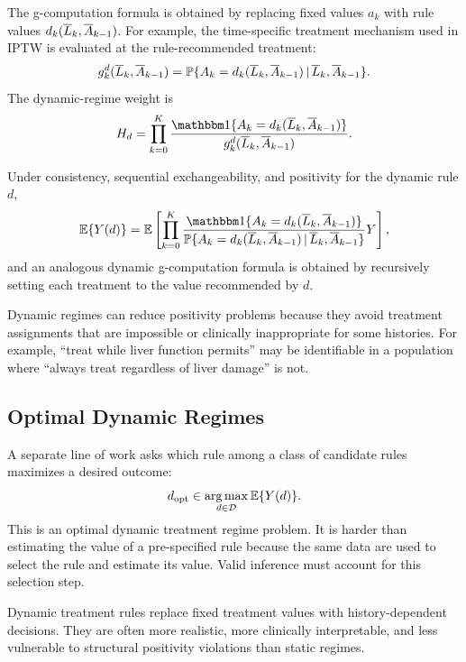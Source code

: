 The g-computation formula is obtained by replacing fixed values $a_k$ with rule
values $d_k(\overline{L}_k,\overline{A}_{k-1})$. For example, the time-specific treatment
mechanism used in IPTW is evaluated at the rule-recommended treatment:
\[
  g_k^d(\overline{L}_k,\overline{A}_{k-1})
  =
  \mathbb{P}\{A_k=d_k(\overline{L}_k,\overline{A}_{k-1})
  \,\vert\, \overline{L}_k,\overline{A}_{k-1}\}.
\]
The dynamic-regime weight is
\[
  H_d=
  \prod_{k=0}^K
  \frac{\ind\{A_k=d_k(\Lbar_k,\Abar_{k-1})\}}
  {g_k^d(\Lbar_k,\Abar_{k-1})}.
\]

\begin{identificationbox}
Under consistency, sequential exchangeability, and positivity for the dynamic
rule $d$,
\[
  \E\{Y(d)\}
  =
  \E\left[
    \prod_{k=0}^K
    \frac{\ind\{A_k=d_k(\Lbar_k,\Abar_{k-1})\}}
    {\Prob\{A_k=d_k(\Lbar_k,\Abar_{k-1})
      \given \Lbar_k,\Abar_{k-1}\}}
    Y
  \right],
\]
and an analogous dynamic g-computation formula is obtained by recursively
setting each treatment to the value recommended by $d$.
\end{identificationbox}

Dynamic regimes can reduce positivity problems because they avoid treatment
assignments that are impossible or clinically inappropriate for some histories.
For example, ``treat while liver function permits'' may be identifiable in a
population where ``always treat regardless of liver damage'' is not.

\subsection{Optimal Dynamic Regimes}

A separate line of work asks which rule among a class of candidate rules
maximizes a desired outcome:
\[
  d_{\mathrm{opt}}\in \operatorname*{arg\,max}_{d\in\mathcal{D}}\mathbb{E}\{Y(d)\}.
\]
This is an optimal dynamic treatment regime problem. It is harder than
estimating the value of a pre-specified rule because the same data are used to
select the rule and estimate its value. Valid inference must account for this
selection step.

\begin{keyidea}
Dynamic treatment rules replace fixed treatment values with history-dependent
decisions. They are often more realistic, more clinically interpretable, and
less vulnerable to structural positivity violations than static regimes.
\end{keyidea}
